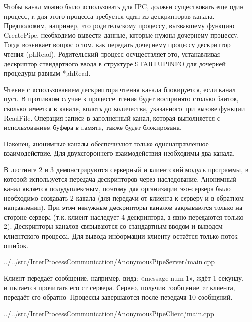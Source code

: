 \documentclass[a4paper, 12pt]{report}		%
\begin{document}
Чтобы канал можно было использовать для IPC, должен существовать еще один процесс, и для этого процесса требуется один из дескрипторов канала. Предположим, например, что родительскому процессу, вызвавшему функцию CreatePipe, необходимо вывести данные, которые нужны дочернему процессу. Тогда возникает вопрос о том, как передать дочернему процессу дескриптор чтения (phRead). Родительский процесс осуществляет это, устанавливая дескриптор стандартного ввода в структуре STARTUPINFO для дочерней процедуры равным *phRead.

Чтение с использованием дескриптора чтения канала блокируется, если канал пуст. В противном случае в процессе чтения будет воспринято столько байтов, сколько имеется в канале, вплоть до количества, указанного при вызове функции ReadFile. Операция записи в заполненный канал, которая выполняется с использованием буфера в памяти, также будет блокирована.

Наконец, анонимные каналы обеспечивают только однонаправленное взаимодействие. Для двухстороннего взаимодействия необходимы два канала.

В листинге 2 и 3 демонстрируются серверный и клиентский модуль программы, в которой используется передача дескрипторов через наследование. Анонимный канал является полудуплексным, поэтому для организации эхо-сервера было необходимо создавать 2 канала (для передачи от клиента к серверу и в обратном направлении). При этом ненужные дескрипторы каналов закрываются только на стороне сервера (т.к. клиент наследует 4 дескриптора, а явно передаются только 2). Дескрипторы каналов связываются со стандартным вводом и выводом клиентского процесса. Для вывода информации клиенту остаётся только поток ошибок.


{../../src/InterProcessCommunication/AnonymousPipeServer/main.cpp}

Клиент передаёт сообщение, например, вида: «message num 1», ждёт 1 секунду, и пытается прочитать его от сервера. Сервер, получив сообщение от клиента, передаёт его обратно. Процессы завершаются после передачи 10 сообщений.


{../../src/InterProcessCommunication/AnonymousPipeClient/main.cpp}
\end{document}
